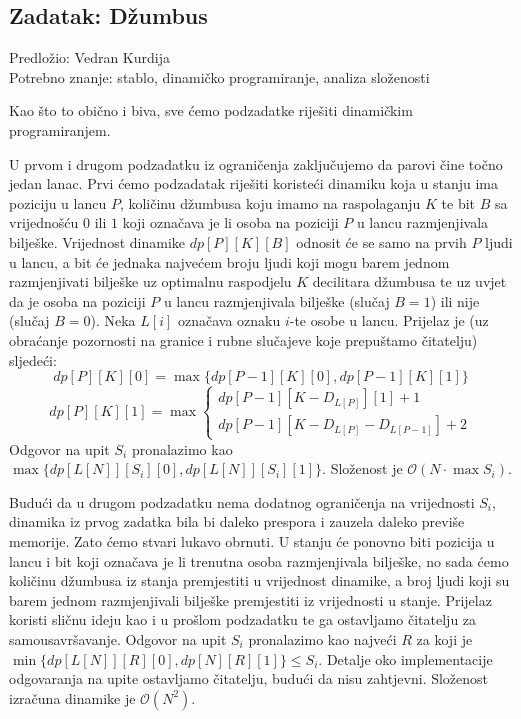 \documentclass[a4paper]{article}
\begin{document}
\subsection*{Zadatak: Džumbus}
\textsf{Predložio: Vedran Kurdija}\\
\textsf{Potrebno znanje: stablo, dinamičko programiranje, analiza složenosti}

Kao što to obično i biva, sve ćemo podzadatke riješiti dinamičkim programiranjem. 

U prvom i drugom podzadatku iz ograničenja zaključujemo da parovi čine točno jedan lanac.
Prvi ćemo podzadatak riješiti koristeći dinamiku koja u stanju ima poziciju u lancu $P$,
količinu džumbusa koju imamo na raspolaganju $K$ te bit $B$ sa vrijednošću $0$ ili $1$
koji označava je li osoba na poziciji $P$ u lancu razmjenjivala bilješke.
Vrijednost dinamike $dp[P][K][B]$ odnosit će se samo na prvih $P$ ljudi u lancu,
a bit će jednaka najvećem broju ljudi koji mogu barem jednom razmjenjivati bilješke uz
optimalnu raspodjelu $K$ decilitara džumbusa te uz uvjet da je osoba na poziciji $P$ u
lancu razmjenjivala bilješke (slučaj $B = 1$) ili nije (slučaj $B = 0$).
Neka $L[i]$ označava oznaku $i$-te osobe u lancu.
Prijelaz je (uz obraćanje pozornosti na granice i rubne slučajeve koje prepuštamo čitatelju)
sljedeći: 
$$dp[P][K][0] = \max \{ dp[P - 1][K][0], dp[P - 1][K][1] \}$$
$$
dp[P][K][1] = \max
\begin{cases}
    dp[P - 1][K - D_{L[P]}][1] + 1 \\
    dp[P - 1][K - D_{L[P]} - D_{L[P - 1]}] + 2
\end{cases}
$$
Odgovor na upit $S_i$ pronalazimo kao $\max \{dp[L[N]][S_i][0], dp[L[N]][S_i][1]\}$.
Složenost je $\mathcal{O}(N \cdot \max S_i)$.

Budući da u drugom podzadatku nema dodatnog ograničenja na vrijednosti $S_i$,
dinamika iz prvog zadatka bila bi daleko prespora i zauzela daleko previše memorije.
Zato ćemo stvari lukavo obrnuti. U stanju će ponovno biti pozicija u lancu i bit koji označava
je li trenutna osoba razmjenjivala bilješke, no sada ćemo količinu džumbusa
iz stanja premjestiti u vrijednost dinamike, a broj ljudi koji su barem jednom razmjenjivali
bilješke premjestiti iz vrijednosti u stanje. Prijelaz koristi sličnu ideju kao i u prošlom
podzadatku te ga ostavljamo čitatelju za samousavršavanje.
Odgovor na upit $S_i$ pronalazimo kao najveći $R$ za koji je
$\min \{dp[L[N]][R][0], dp[N][R][1]\} \le S_i$.
Detalje oko implementacije odgovaranja na upite ostavljamo čitatelju,
budući da nisu zahtjevni. Složenost izračuna dinamike je $\mathcal{O}(N^2)$. 
\end{document}
